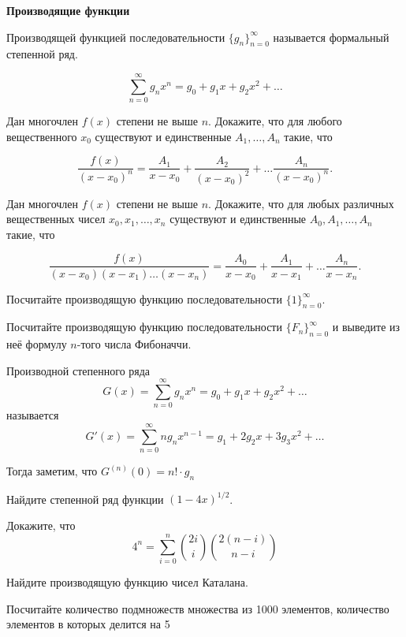 \documentclass{article}
\begin{document}
    \large


    \begin{center}
        \textbf{Производящие функции}
    \end{center}

    Производящей функцией последовательности $\{g_n\}_{n = 0}^{\infty}$ называется формальный степенной ряд.

    \[\sum_{n = 0}^{\infty}g_{n}x^n = g_0 + g_{1}x + g_{2}x^2 + \dotsc\]
    \begin{enumerate_boxed}

        \item Дан многочлен $f(x)$ степени не выше $n$.
        Докажите, что для любого вещественного $x_0$ существуют и единственные $A_1, \dotsc , A_n$ такие, что

        \[\frac{f(x)}{(x - x_0)^n} = \frac{A_1}{x-x_0} + \frac{A_2}{(x-x_0)^2} + \dotsc \frac{A_n}{(x-x_0)^n}.\]

        \item Дан многочлен $f(x)$ степени не выше $n$.
        Докажите, что для любых различных вещественных чисел $x_0, x_1, \dotsc, x_n$ существуют и единственные $A_0, A_1, \dotsc , A_n$ такие, что

        \[\frac{f(x)}{(x - x_0)(x-x_1)\dotsc(x-x_n)} = \frac{A_0}{x-x_0} + \frac{A_1}{x-x_1} + \dotsc \frac{A_n}{x-x_n}.\]

        \item Посчитайте производящую функцию последовательности $\{1\}_{n = 0}^{\infty}$.

        \item Посчитайте производящую функцию последовательности $\{F_n\}_{n = 0}^{\infty}$ и выведите из неё формулу $n$-того числа Фибоначчи.

        Производной степенного ряда
        \[G(x) = \sum_{n = 0}^{\infty}g_{n}x^n = g_0 + g_{1}x + g_{2}x^2 + \dotsc\]
        называется
        \[G'(x) = \sum_{n = 0}^{\infty}ng_{n}x^{n-1} = g_1 + 2g_{2}x + 3g_{3}x^2 + \dotsc\]

        Тогда заметим, что $G^{(n)}(0) = n! \cdot g_n$

        \item Найдите степенной ряд функции $(1 - 4x)^{1/2}$.

        \item Докажите, что \[4^n = \sum_{i = 0}^n \binom{2i}{i} \binom{2(n-i)}{n-i}\]

        \item Найдите производящую функцию чисел Каталана.

        \item Посчитайте количество подмножеств множества из 1000 элементов, количество элементов в которых делится на 5


    \end{enumerate_boxed}
\end{document}
